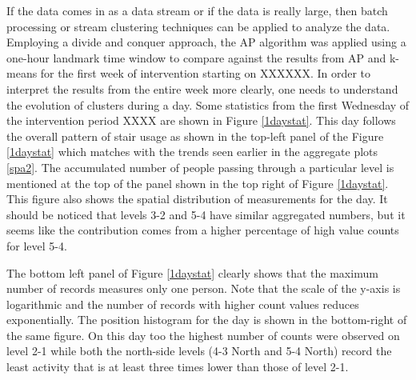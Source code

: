 \documentclass[../UNBThesis2.tex]{subfiles}
\begin{document}
    
If the data comes in as a data stream or if the data is really large, then batch processing or stream clustering techniques can be applied to analyze the data. Employing a divide and conquer approach, the AP algorithm was applied using a one-hour landmark time window to compare against the results from AP and k-means for the first week of intervention starting on XXXXXX. In order to interpret the results from the entire week more clearly, one needs to understand the evolution of clusters during a day. Some statistics from the first Wednesday of the intervention period XXXX are shown in Figure \ref{1daystat}. This day follows the overall pattern of stair usage as shown in the top-left panel of the Figure \ref{1daystat} which matches with the trends seen earlier in the aggregate plots \ref{spa2}. The accumulated number of people passing through a particular level is mentioned at the top of the panel shown in the top right of Figure \ref{1daystat}. This figure also shows the spatial distribution of measurements for the day. It should be noticed that levels 3-2 and 5-4 have similar aggregated numbers, but it seems like the contribution comes from a higher percentage of high value counts for level 5-4.

The bottom left panel of Figure \ref{1daystat} clearly shows that the maximum number of records measures only one person. Note that the scale of the y-axis is logarithmic and the number of records with higher count values reduces exponentially. The position histogram for the day is shown in the bottom-right of the same figure. On this day too the highest number of counts were observed on level 2-1 while both the north-side levels (4-3 North and 5-4 North) record the least activity that is at least three times lower than those of level 2-1. 
\end{document}
